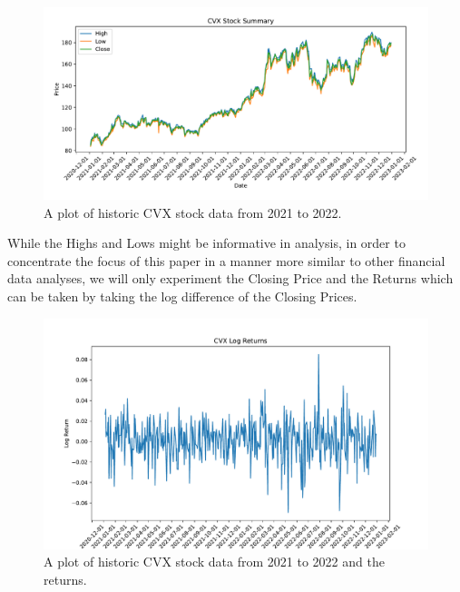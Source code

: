\documentclass[12pt, letterpaper, titlepage]{article}
\newcommand{\jy}[1]{\textcolor{blue}{JY: #1}}
\begin{document}
\begin{figure}[tbp]
  \begin{center}
  \includegraphics[width=\textwidth]{../figures/fig1.pdf}
  \caption{A plot of historic CVX stock data from 2021 to 2022.}\label{fig:stockdata}
  \end{center}
\end{figure}


While the Highs and Lows might be informative in analysis, in order to concentrate the focus of this paper in a manner more similar to other financial data analyses, we will only experiment the Closing Price and the Returns which can be taken by taking the log difference of the Closing Prices. 	

\begin{figure}[tbp]
  \begin{center}
  \includegraphics[width=\textwidth]{../figures/fig2.pdf}
  \caption{A plot of historic CVX stock data from 2021 to 2022 and the returns.}\label{fig:returns}
  \end{center}
\end{figure}
\end{document}
